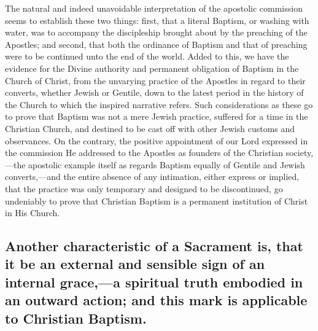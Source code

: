 \documentclass[english,]{book}
\begin{document}
The natural and indeed unavoidable interpretation of the apostolic commission seems to establish these two things: first, that a literal Baptism, or washing with water, was to accompany the discipleship brought about by the preaching of the Apostles; and second, that both the ordinance of Baptism and that of preaching were to be continued unto the end of the world. Added to this, we have the evidence for the Divine authority and permanent obligation of Baptism in the Church of Christ, from the unvarying practice of the Apostles in regard to their converts, whether Jewish or Gentile, down to the latest period in the history of the Church to which the inspired narrative refers. Such considerations as these go to prove that Baptism was not a mere Jewish practice, suffered for a time in the Christian Church, and destined to be cast off with other Jewish customs and observances. On the contrary, the positive appointment of our Lord expressed in the commission He addressed to the Apostles as founders of the Christian society,---the apostolic example itself as regards Baptism equally of Gentile and Jewish converts,---and the entire absence of any intimation, either express or implied, that the practice was only temporary and designed to be discontinued, go undeniably to prove that Christian Baptism is a permanent institution of Christ in His Church.

\hypertarget{another-characteristic-of-a-sacrament-is-that-it-be-an-external-and-sensible-sign-of-an-internal-gracea-spiritual-truth-embodied-in-an-outward-action-and-this-mark-is-applicable-to-christian-baptism.}{%
\subsection{Another characteristic of a Sacrament is, that it be an external and sensible sign of an internal grace,---a spiritual truth embodied in an outward action; and this mark is applicable to Christian Baptism.}\label{another-characteristic-of-a-sacrament-is-that-it-be-an-external-and-sensible-sign-of-an-internal-gracea-spiritual-truth-embodied-in-an-outward-action-and-this-mark-is-applicable-to-christian-baptism.}}
\end{document}
